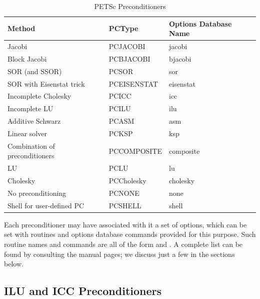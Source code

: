 \begin{table}
\begin{center}
\begin{tabular}{lll}
{\bf Method}    &{\bf PCType}   & {\bf Options Database Name}\\
\hline
Jacobi                               & PCJACOBI      & jacobi\\
Block Jacobi                         & PCBJACOBI     & bjacobi\\
SOR (and SSOR)                       & PCSOR         & sor\\
SOR with Eisenstat trick             & PCEISENSTAT   & eisenstat\\
Incomplete Cholesky                  & PCICC         & icc\\
Incomplete LU                        & PCILU         & ilu\\
Additive Schwarz                     & PCASM         & asm\\
Linear solver                        & PCKSP        & ksp \\
Combination of preconditioners       & PCCOMPOSITE   & composite \\
\hline
LU                                   & PCLU          & lu\\
Cholesky                             & PCCholesky    & cholesky\\
No preconditioning                   & PCNONE        & none\\
Shell for user-defined PC            & PCSHELL       & shell\\
\hline
\end{tabular}
\end{center}
\caption{PETSc Preconditioners}
\label{tab_pcdefaults}
\end{table}

Each preconditioner may have associated with it a set of options,
which can be set with routines and options database commands provided
for this purpose.  Such routine names and commands are all of the form
 and .  A
complete list can be found by consulting the manual pages; we discuss
just a few in the sections below.

\subsection{ILU and ICC Preconditioners}
\label{sec_ilu_icc}

